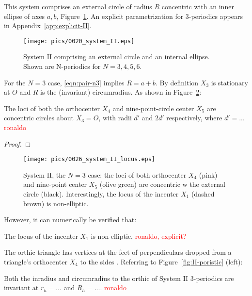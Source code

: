 This system comprises an external circle of radius $R$ concentric with an inner ellipse of axes $a,b$, Figure~\ref{fig:II-all}. An explicit parametrization for 3-periodics appears in Appendix~\ref{app:explicit-II}.

\begin{figure}
    \centering
\texttt{[image: pics/0020\_system\_II.eps]}
    \caption{System II comprising an external circle and an internal ellipse. Shown are N-periodics for $N=3,4,5,6$.}
    \label{fig:II-all}
\end{figure}

For the $N=3$ case, \eqref{eqn:pair-n3} implies $R=a+b$. By definition $X_3$ is stationary at $O$ and $R$ is the (invariant) circumradius. As shown in Figure~\ref{fig:II-loci}:

\begin{proposition}
The loci of both the orthocenter $X_4$ and nine-point-circle center $X_5$ are concentric circles about $X_3=O$, with radii $d'$ and $2d'$ respectively, where $d'=...$ \textcolor{red}{ronaldo}
\label{prop:II-loci}
\end{proposition}

\begin{proof}

\end{proof}

\begin{figure}
    \centering
    \texttt{[image: pics/0026\_system\_II\_locus.eps]}
    \caption{System II, the $N=3$ case: the loci of both orthocenter $X_4$ (pink) and nine-point center $X_5$ (olive green) are concentric w the external circle (black). Interestingly, the locus of the incenter $X_1$ (dashed brown) is non-elliptic.}
    \label{fig:II-loci}
\end{figure}

However, it can numerically be verified that:

\begin{obs}
The locus of the incenter $X_1$ is non-elliptic. \textcolor{red}{ronaldo, explicit?}
\end{obs}

The orthic triangle has vertices at the feet of perpendiculars dropped from a triangle's orthocenter $X_4$ to the sides \cite{mw}. Referring to Figure~\ref{fig:II-poristic} (left):

\begin{proposition}
Both the inradius and circumradius to the orthic of System II 3-periodics are invariant at $r_h=...$ and $R_h=...$. \textcolor{red}{ronaldo}
\label{prop:II-orthic-radii}
\end{proposition}


